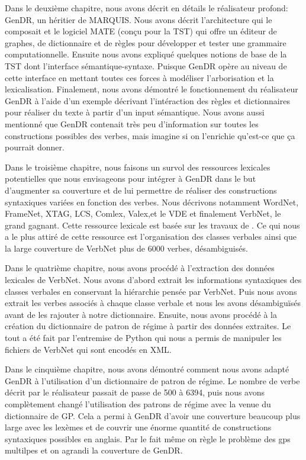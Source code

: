 Dans le deuxième chapitre, nous avons décrit en détails le réalisateur profond: GenDR, un héritier de MARQUIS. Nous avons décrit l'architecture qui le composait et le logiciel MATE (conçu pour la TST) qui offre un éditeur de graphes, de dictionnaire et de règles pour développer et tester une grammaire computationnelle. Ensuite nous avons expliqué quelques notions de base de la TST dont l'interface sémantique-syntaxe. Puisque GenDR opère au niveau de cette interface en mettant toutes ces forces à modéliser l'arborisation et la lexicalisation. Finalement, nous avons démontré le fonctionnement du réalisateur GenDR à l'aide d'un exemple décrivant l'intéraction des règles et dictionnaires pour réaliser du texte à partir d'un input sémantique. Nous avons aussi mentionné que GenDR contenait très peu d'information sur toutes les constructions possibles des verbes, mais imagine si on l'enrichie qu'est-ce que ça pourrait donner.

Dans le troisième chapitre, nous faisons un survol des ressources lexicales potentielles que nous envisageons pour intégrer à GenDR dans le but d'augmenter sa couverture et de lui permettre de réaliser des constructions syntaxiques variées en fonction des verbes. Nous décrivons notamment WordNet, FrameNet, XTAG, LCS, Comlex, Valex,et le VDE et finalement VerbNet, le grand gagnant. Cette ressource lexicale est basée sur les travaux de \cite{verb-classes.levin.1993}. Ce qui nous a le plus attiré de cette ressource est l'organisation des classes verbales ainsi que la large couverture de VerbNet plus de 6000 verbes, désambiguisés.

Dans le quatrième chapitre, nous avons procédé à l'extraction des données lexicales de VerbNet. Nous avons d'abord extrait les informations syntaxiques des classes verbales en conservant la hiérarchie pensée par VerbNet. Puis nous avons extrait les verbes associés à chaque classe verbale et nous les avons désambiguïsés avant de les rajouter à notre dictionnaire. Ensuite, nous avons procédé à la création du dictionnaire de patron de régime à partir des données extraites. Le tout a été fait par l'entremise de Python qui nous a permis de manipuler les fichiers de VerbNet qui sont encodés en XML.

Dans le cinquième chapitre, nous avons démontré comment nous avons adapté GenDR à l'utilisation d'un dictionnaire de patron de régime. Le nombre de verbe décrit par le réalisateur passait de passe de 500 à 6394, puis nous avons complètement changé l'utilisation des patrons de régime avec la venue du dictionnaire de \ac{GP}. Cela a permi à GenDR d'avoir une couverture beaucoup plus large avec les lexèmes et de couvrir une énorme quantité de constructions syntaxiques possibles en anglais. Par le fait même on règle le problème des gps multilpes et on agrandi la couverture de GenDR. 
	
